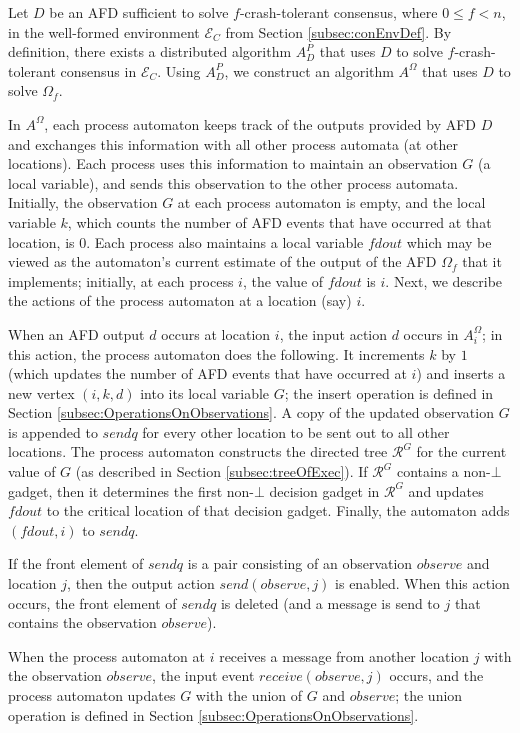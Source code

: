 \documentclass[11pt]{article}
\numberwithin{theorem}{section}
\newcommand{\FD}{D}
\begin{document}
Let $\FD$ be an AFD sufficient to solve $f$-crash-tolerant consensus,
where $0 \leq f < n$, in the well-formed environment $\mathcal{E}_C$
from Section \ref{subsec:conEnvDef}. By definition, there exists a
distributed algorithm $A_D^P$ that uses $\FD$ to solve
$f$-crash-tolerant consensus in $\mathcal{E}_C$. Using $A_D^P$, we
construct an algorithm $A^\Omega$ that uses $\FD$ to solve
$\Omega_f$. 


In $A^\Omega$, each process automaton keeps track of the outputs
provided by AFD $\FD$ and exchanges this information with all other
process automata (at other locations).
Each process uses this information to maintain an observation $G$ (a local variable), and sends this observation to the other process automata. Initially, the observation $G$
at each process automaton is empty, and the local variable $k$, which
counts the number of AFD events that have occurred at that location,
is $0$. Each process also maintains a local variable $fdout$ which may be viewed as the automaton's current estimate of the output of the AFD $\Omega_f$ that it implements; initially, at each process $i$, the value of $fdout$ is $i$. Next, we describe the actions of the process automaton at a location
(say) $i$. 

When an AFD output $d$ occurs at location $i$, the input action
$d$ occurs in $A^\Omega_i$; in this action, the process automaton does 
the following.
It increments $k$ by $1$ (which updates the number of AFD events that
have occurred at $i$) and inserts a new vertex $(i,k,d)$ into its local variable $G$; the insert operation is defined in Section \ref{subsec:OperationsOnObservations}.
A copy of the updated observation $G$ is appended to $sendq$ for every
other location to be sent out to all other locations. The process automaton
constructs the directed tree $\mathcal{R}^G$ for the current value of $G$ (as described in Section \ref{subsec:treeOfExec}). If $\mathcal{R}^G$ contains a non-$\bot$ gadget, then it determines the first non-$\bot$ decision gadget in 
$\mathcal{R}^G$ and
updates $fdout$ to the critical location of that decision gadget. Finally, the automaton adds
$(fdout,i)$ to $sendq$.

If the front element of $sendq$ is a pair consisting of an observation $observe$
and  location $j$, then the output action $send(observe,j)$ is enabled. When this
action occurs, the front element of $sendq$ is deleted (and a message is
send to $j$ that contains the observation $observe$).

When the process automaton at $i$ receives a message from another
location $j$ with the observation $observe$, the input event $receive(observe,j)$
occurs, and the process automaton updates $G$ with the union of $G$
and $observe$; the union operation is defined in Section \ref{subsec:OperationsOnObservations}.
\end{document}
